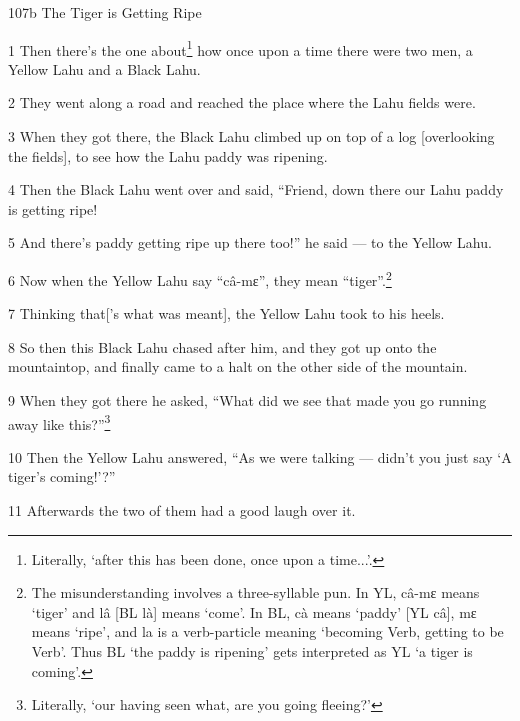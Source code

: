 
107b The Tiger is Getting Ripe

1 Then there's the one about\footnote{Literally, `after this has been done, once upon a time...'.} how once upon a time there were two men, a Yellow
Lahu and a Black Lahu.

2 They went along a road and reached the place where the Lahu fields were.

3 When they got there, the Black Lahu climbed up on top of a log [overlooking the
fields], to see how the Lahu paddy was ripening.

4 Then the Black Lahu went over and said, ``Friend, down there our Lahu paddy is
getting ripe!

5 And there's paddy getting ripe up there too!'' he said --- to the Yellow Lahu.

6 Now when the Yellow Lahu say ``câ-mɛ'', they mean ``tiger''.\footnote{The misunderstanding involves a three-syllable pun. In YL, câ-mɛ means `tiger' and lâ [BL là] means `come'. In BL, cà means `paddy' [YL câ], mɛ means `ripe', and la is a verb-particle meaning `becoming Verb, getting to be Verb'. Thus BL `the paddy is ripening' gets interpreted as YL `a tiger is coming'.}

7 Thinking that['s what was meant], the Yellow Lahu took to his heels.

8 So then this Black Lahu chased after him, and they got up onto the mountaintop,
and finally came to a halt on the other side of the mountain.

9 When they got there he asked, ``What did we see that made you go running away
like this?''\footnote{Literally, `our having seen what, are you going fleeing?'}

10 Then the Yellow Lahu answered, ``As we were talking --- didn't you just say
`A tiger's coming!'?''

11 Afterwards the two of them had a good laugh over it.

